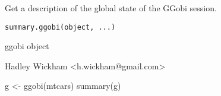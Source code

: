 \begin{Description}\relax
Get a description of the global state of the GGobi session.
\end{Description}
\begin{Usage}
\begin{verbatim}summary.ggobi(object, ...)\end{verbatim}
\end{Usage}
\begin{Arguments}
\begin{ldescription}
\item[\code{object}] ggobi object
\item[\code{...}] 
\end{ldescription}
\end{Arguments}
\begin{Details}\relax
\end{Details}
\begin{Author}\relax
Hadley Wickham <h.wickham@gmail.com>
\end{Author}
\begin{Examples}
\begin{ExampleCode}g <- ggobi(mtcars)
summary(g)\end{ExampleCode}
\end{Examples}

